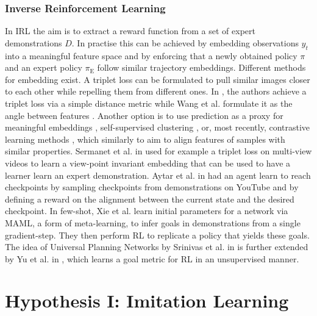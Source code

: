 \subsubsection{Inverse Reinforcement Learning}
In IRL the aim is to extract a reward function from a set of expert demonstrations $D$. In practise this can be achieved by embedding observations $y_t$ into a meaningful feature space and by enforcing that a newly obtained policy $\pi$ and an expert policy $\pi_\text{E}$ follow similar trajectory embeddings. Different methods for embedding exist. A triplet loss can be formulated to pull similar images closer to each other while repelling them from different ones. In \cite{wang2014learning, schroff2015facenet}, the authors achieve a triplet loss via a simple distance metric while Wang et al. formulate it as the angle between features \cite{wang2015unsupervised}. Another option is to use prediction as a proxy for meaningful embeddings \cite{vondrick2016anticipating, sermanet2016unsupervised, srivastava2015unsupervised, mathieu2015deep}, self-supervised clustering \cite{caron2018deep}, or, most recently, contrastive learning methods \cite{khosla2020supervised}, which similarly to \cite{wang2015unsupervised} aim to align features of samples with similar properties. Sermanet et al. in \cite{sermanet2018time} used for example a triplet loss on multi-view videos to learn a view-point invariant embedding that can be used to have a learner learn an expert demonstration. Aytar et al. in \cite{aytar2018playing} had an agent learn to reach checkpoints by sampling checkpoints from demonstrations on YouTube and by defining a reward on the alignment between the current state and the desired checkpoint. In few-shot, Xie et al. \cite{xie2018few} learn initial parameters for a network via MAML, a form of meta-learning, to infer goals in demonstrations from a single gradient-step. They then perform RL to replicate a policy that yields these goals. The idea of Universal Planning Networks by Srinivas et al. in \cite{srinivas2018universal} is further extended by Yu et al. in \cite{yu2019unsupervised}, which learns a goal metric for RL in an unsupervised manner.

\section{Hypothesis I: Imitation Learning}

